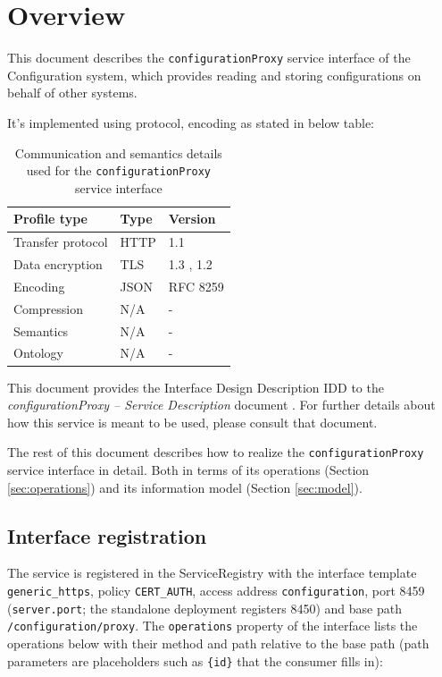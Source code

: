 \documentclass[a4paper]{arrowhead}
\begin{document}
\section{Overview}
\label{sec:overview}

This document describes the \texttt{configurationProxy} service interface of the Configuration system, which provides reading and storing configurations on behalf of other systems.

It's implemented using protocol, encoding as stated in below table:
\begin{table}[ht!]
  \centering
  \begin{tabular}{|l|l|l|}
    \hline
    \rowcolor{gray!33} Profile type & Type & Version \\ \hline
    Transfer protocol & HTTP & 1.1 \cite{rfc9112} \\ \hline
    Data encryption & TLS & 1.3 \cite{rfc8446}, 1.2 \cite{rfc5246} \\ \hline
    Encoding & JSON & RFC 8259 \cite{rfc8259} \\ \hline
    Compression & N/A & - \\ \hline
    Semantics & N/A & - \\ \hline
    Ontology & N/A & - \\ \hline
  \end{tabular}
  \caption{Communication and semantics details used for the \texttt{configurationProxy} service interface}
  \label{tab:comunication_semantics_profile}
\end{table}

This document provides the Interface Design Description IDD to the \textit{configurationProxy -- Service Description} document \cite{cfg-configurationProxy-sd}.
For further details about how this service is meant to be used, please consult that document.

The rest of this document describes how to realize the \texttt{configurationProxy} service
interface in detail. Both in terms of its operations (Section \ref{sec:operations}) and its information model (Section \ref{sec:model}).

\subsection{Interface registration}

The service is registered in the ServiceRegistry with the interface template \texttt{generic\_\allowbreak{}https}, policy \texttt{CERT\_\allowbreak{}AUTH}, access address \texttt{configuration}, port 8459 (\texttt{server.\allowbreak{}port}; the standalone deployment registers 8450) and base path \texttt{/\allowbreak{}configuration/\allowbreak{}proxy}. The \texttt{operations} property of the interface lists the operations below with their method and path relative to the base path (path parameters are placeholders such as \texttt{\{id\}} that the consumer fills in):
\end{document}
